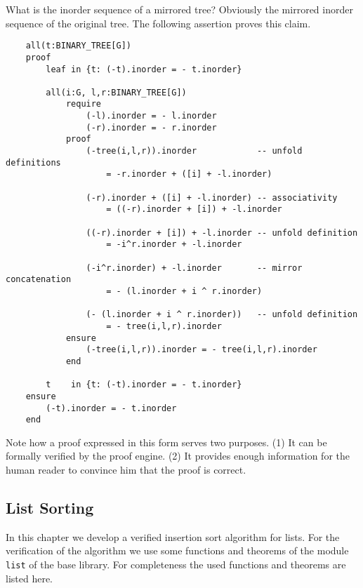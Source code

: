 What is the inorder sequence of a mirrored tree? Obviously the mirrored
inorder sequence of the original tree. The following assertion proves this
claim.

\begin{lstlisting}
    all(t:BINARY_TREE[G])
    proof
        leaf in {t: (-t).inorder = - t.inorder}

        all(i:G, l,r:BINARY_TREE[G])
            require
                (-l).inorder = - l.inorder
                (-r).inorder = - r.inorder
            proof
                (-tree(i,l,r)).inorder            -- unfold definitions
                    = -r.inorder + ([i] + -l.inorder)

                (-r).inorder + ([i] + -l.inorder) -- associativity
                    = ((-r).inorder + [i]) + -l.inorder

                ((-r).inorder + [i]) + -l.inorder -- unfold definition
                    = -i^r.inorder + -l.inorder

                (-i^r.inorder) + -l.inorder       -- mirror concatenation
                    = - (l.inorder + i ^ r.inorder)

                (- (l.inorder + i ^ r.inorder))   -- unfold definition
                    = - tree(i,l,r).inorder
            ensure
                (-tree(i,l,r)).inorder = - tree(i,l,r).inorder
            end

        t    in {t: (-t).inorder = - t.inorder}
    ensure
        (-t).inorder = - t.inorder
    end  
\end{lstlisting}

Note how a proof expressed in this form serves two purposes. (1) It can be
formally verified by the proof engine. (2) It provides enough information for
the human reader to convince him that the proof is correct.

\subsection{List Sorting}

In this chapter we develop a verified insertion sort algorithm for lists. For
the verification of the algorithm we use some functions and theorems of the
module \lstinline!list! of the base library. For completeness the used
functions and theorems are listed here.

